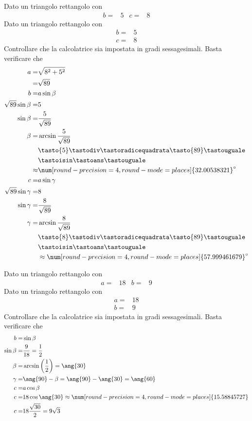 \begin{exercise}
	Dato un triangolo rettangolo con
	\begin{align*}
	b=&5&
	c=&8
	\end{align*}
	\tcblower
	Dato un triangolo rettangolo con
	\begin{align*}
	b=&5\\
	c=&8
	\end{align*}
	Controllare che la calcolatrice sia impostata in gradi sessagesimali.
	Basta verificare che \testgradi 
	\begin{align*}
	a=&\sqrt{8^2+5^2}\\
	=&\sqrt{89}\\
	b=&a\sin\beta\\
	\sqrt{89}\sin\beta=&5\\
	\sin\beta=&\frac{5}{\sqrt{89}}\\
	\beta=&\arcsin\frac{5}{\sqrt{89}}\\
	&\tasto{5}\tastodiv\tastoradicequadrata\tasto{89}\tastouguale\\
	&\tastoisin\tastoans\tastouguale\\
	\approx&\num[round-precision=\lungarrotandamento,round-mode=places]{32.00538321}^\circ\\
	c=&a\sin\gamma\\
\sqrt{89}\sin\gamma=&8\\
\sin\gamma=&\frac{8}{\sqrt{89}}\\
\gamma=&\arcsin\frac{8}{\sqrt{89}}\\
&\tasto{8}\tastodiv\tastoradicequadrata\tasto{89}\tastouguale\\
&\tastoisin\tastoans\tastouguale\\
&\approx\num[round-precision=\lungarrotandamento,round-mode=places]{57.999461679}^\circ\\
	\end{align*}
\end{exercise}
\begin{exercise}
	Dato un triangolo rettangolo con
	\begin{align*}
	a=&18&
	b=&9
	\end{align*}
	\tcblower
	Dato un triangolo rettangolo con
	\begin{align*}
a=&18\\
b=&9
\end{align*}
	Controllare che la calcolatrice sia impostata in gradi sessagesimali.
	Basta verificare che \testgradi 
	\begin{align*}
b=&\sin\beta\\
\sin\beta=&\dfrac{9}{18}=\dfrac{1}{2}\\
\beta=&\arcsin\left(\dfrac{1}{2}\right)=\ang{30}\\
\gamma=&\ang{90}-\beta=\ang{90}-\ang{30}=\ang{60}\\
c=&a\cos\beta\\
c=&18\cos\ang{30}\approx\num[round-precision=\lungarrotandamento,round-mode=places]{15.58845727}\\
c=&18\dfrac{\sqrt{30}}{2}=9\sqrt{3}
	\end{align*}
\end{exercise}
